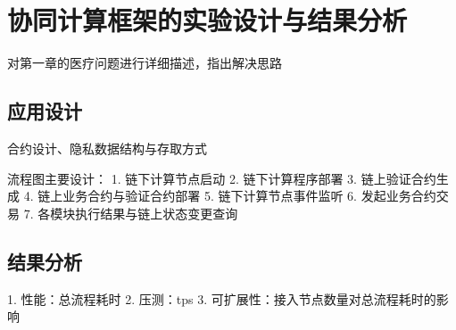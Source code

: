 \section{协同计算框架的实验设计与结果分析}
对第一章的医疗问题进行详细描述，指出解决思路

\subsection{应用设计}
合约设计、隐私数据结构与存取方式

流程图主要设计：
1. 链下计算节点启动
2. 链下计算程序部署
3. 链上验证合约生成
4. 链上业务合约与验证合约部署
5. 链下计算节点事件监听
6. 发起业务合约交易
7. 各模块执行结果与链上状态变更查询

\subsection{结果分析}
1. 性能：总流程耗时
2. 压测：tps
3. 可扩展性：接入节点数量对总流程耗时的影响
